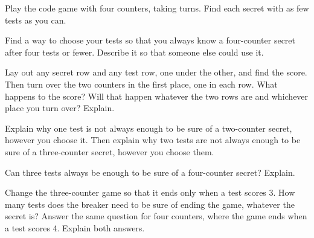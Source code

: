 \problem Play the code game with four counters, taking turns.
Find each secret with as few tests as you can.

\vspace{0.1in}

\newpage

\problem Find a way to choose your tests so that you always know a four-counter secret after four tests or fewer.
Describe it so that someone else could use it.

\vspace{0.1in}
\noindent{}\hfill{}\hfill{}


\newpage

\problem Lay out any secret row and any test row, one under the other, and find the score.
Then turn over the two counters in the first place, one in each row.
What happens to the score?
Will that happen whatever the two rows are and whichever place you turn over? Explain.


\vspace{0.25in}

\problem Explain why one test is not always enough to be sure of a two-counter secret, however you choose it.
Then explain why two tests are not always enough to be sure of a three-counter secret, however you choose them.

\vspace{0.05in}
\noindent{}\hfill{}\hfill{}\hfill{}


\newpage

\problem Can three tests always be enough to be sure of a four-counter secret? Explain.

\vspace{0.1in}
\noindent{}\hfill{}\hfill{}


\newpage

\problem Change the three-counter game so that it ends only when a test scores 3.
How many tests does the breaker need to be sure of ending the game, whatever the secret is?
Answer the same question for four counters, where the game ends when a test scores 4.
Explain both answers.

\vspace{0.1in}
\noindent{}\hfill{}\hfill{}\hfill{}



